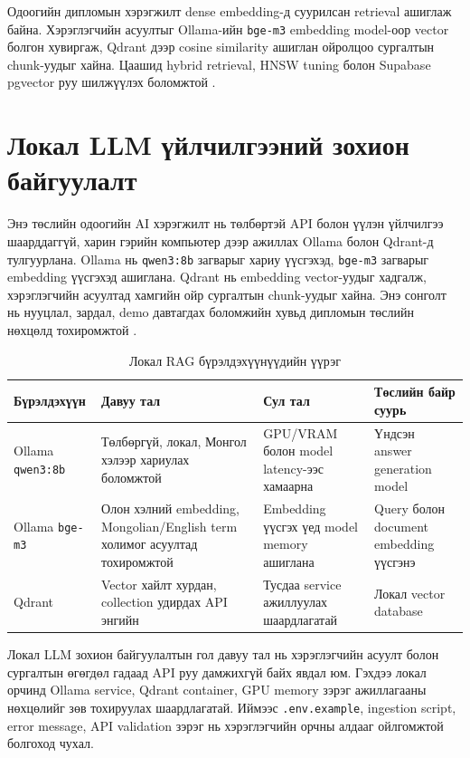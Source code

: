 Одоогийн дипломын хэрэгжилт dense embedding-д суурилсан retrieval ашиглаж байна. Хэрэглэгчийн асуултыг Ollama-ийн \texttt{bge-m3} embedding model-оор vector болгон хувиргаж, Qdrant дээр cosine similarity ашиглан ойролцоо сургалтын chunk-уудыг хайна. Цаашид hybrid retrieval, HNSW tuning болон Supabase pgvector руу шилжүүлэх боломжтой \cite{hnsw_malkov_2018,supabase_vectors,pgvector_github}.

\section{Локал LLM үйлчилгээний зохион байгуулалт}
Энэ төслийн одоогийн AI хэрэгжилт нь төлбөртэй API болон үүлэн үйлчилгээ шаарддаггүй, харин гэрийн компьютер дээр ажиллах Ollama болон Qdrant-д тулгуурлана. Ollama нь \texttt{qwen3:8b} загварыг хариу үүсгэхэд, \texttt{bge-m3} загварыг embedding үүсгэхэд ашиглана. Qdrant нь embedding vector-уудыг хадгалж, хэрэглэгчийн асуултад хамгийн ойр сургалтын chunk-уудыг хайна. Энэ сонголт нь нууцлал, зардал, demo давтагдах боломжийн хувьд дипломын төслийн нөхцөлд тохиромжтой \cite{ollama_qwen3}.

\begin{table}[htbp]
  \centering
  \begin{tabular}{|p{}|p{}|p{}|p{}|}
    \hline
    \textbf{Бүрэлдэхүүн} & \textbf{Давуу тал} & \textbf{Сул тал} & \textbf{Төслийн байр суурь} \\ \hline
    Ollama \texttt{qwen3:8b} & Төлбөргүй, локал, Монгол хэлээр хариулах боломжтой & GPU/VRAM болон model latency-ээс хамаарна & Үндсэн answer generation model \\ \hline
    Ollama \texttt{bge-m3} & Олон хэлний embedding, Mongolian/English term холимог асуултад тохиромжтой & Embedding үүсгэх үед model memory ашиглана & Query болон document embedding үүсгэнэ \\ \hline
    Qdrant & Vector хайлт хурдан, collection удирдах API энгийн & Тусдаа service ажиллуулах шаардлагатай & Локал vector database \\ \hline
  \end{tabular}
  \caption{Локал RAG бүрэлдэхүүнүүдийн үүрэг}
  \label{tab:provider-comparison}
\end{table}

Локал LLM зохион байгуулалтын гол давуу тал нь хэрэглэгчийн асуулт болон сургалтын өгөгдөл гадаад API руу дамжихгүй байх явдал юм. Гэхдээ локал орчинд Ollama service, Qdrant container, GPU memory зэрэг ажиллагааны нөхцөлийг зөв тохируулах шаардлагатай. Иймээс \texttt{.env.example}, ingestion script, error message, API validation зэрэг нь хэрэглэгчийн орчны алдааг ойлгомжтой болгоход чухал.

